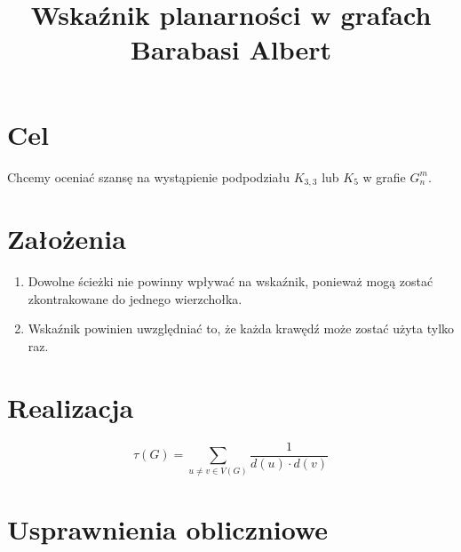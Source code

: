 \documentclass{article}
\title{ Wskaźnik planarności w grafach Barabasi Albert }
\author{}
\date{}
\begin{document}
\maketitle

\section{Cel}
Chcemy oceniać szansę na wystąpienie podpodziału $K_{3,3}$ lub $K_5$ w grafie $G^m_n$.

\section{Założenia}
\begin{enumerate}
    \item Dowolne ścieżki nie powinny wpływać na wskaźnik, ponieważ mogą zostać zkontrakowane do jednego wierzchołka.
    \item Wskaźnik powinien uwzględniać to, że każda krawędź może zostać użyta tylko raz.
\end{enumerate}

\section{Realizacja}
\begin{dmath}
    \tau(G) = \sum_{u \neq v \in V(G)} \frac{1}{d(u) \cdot d(v)}
\end{dmath}

\section{Usprawnienia obliczniowe}
\end{document}
